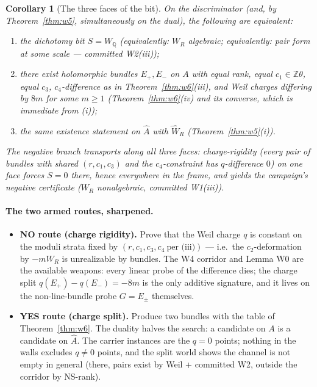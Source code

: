 \documentclass[11pt]{article}
\newtheorem{corollary}[theorem]{Corollary}
\theoremstyle{definition}
\newcommand{\Q}{\mathbb{Q}}
\newcommand{\Z}{\mathbb{Z}}
\begin{document}
\begin{corollary}[The three faces of the bit]\label{cor:frame}
On the discriminator (and, by Theorem~\ref{thm:w5}, simultaneously on the
dual), the following are equivalent:
\begin{enumerate}
\item[(a)] the dichotomy bit $S=W_\Q$ (equivalently: $W_R$ algebraic;
equivalently: pair form at some scale --- committed W2(iii));
\item[(b)] there exist holomorphic bundles $E_+,E_-$ on $A$ with equal rank,
equal $c_1\in\Z\theta$, equal $c_3$, $c_4$-difference as in
Theorem~\ref{thm:w6}(iii), and Weil charges differing by $8m$ for some
$m\ge 1$ (Theorem~\ref{thm:w6}(iv) and its converse, which is immediate from
(i));
\item[(c)] the same existence statement on $\widehat A$ with
$\widehat W_R$ (Theorem~\ref{thm:w5}(i)).
\end{enumerate}
The negative branch transports along all three faces: charge-rigidity
(every pair of bundles with shared $(r,c_1,c_3)$ and the $c_4$-constraint has
$q$-difference $0$) on \emph{one} face forces $S=0$ there, hence everywhere
in the frame, and yields the campaign's negative certificate
($W_R$ nonalgebraic, committed W1(iii)).
\end{corollary}

\paragraph{The two armed routes, sharpened.}
\begin{itemize}
\item \textbf{NO route (charge rigidity).} Prove that the Weil charge
$q$ is constant on the moduli strata fixed by $(r,c_1,c_3,c_4\ \text{per
(iii)})$ --- i.e.\ the $c_2$-deformation by $-mW_R$ is unrealizable by
bundles. The W4 corridor and Lemma W0 are the available weapons: every
linear probe of the difference dies; the charge split
$q(E_+)-q(E_-)=-8m$ is the only additive signature, and it lives on the
non-line-bundle probe $G=E_\pm$ themselves.
\item \textbf{YES route (charge split).} Produce two bundles with the
table of Theorem~\ref{thm:w6}. The duality halves the search: a candidate on
$A$ is a candidate on $\widehat A$. The carrier instances are the $q=0$
points; nothing in the walls excludes $q\ne 0$ points, and the split world
shows the channel is not empty in general (there, pairs exist by Weil +
committed W2, outside the corridor by NS-rank).
\end{itemize}
\end{document}
